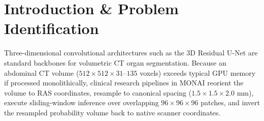 \documentclass[10pt,twocolumn]{article}
\begin{document}
\begin{abstract}
\smallskip
\noindent\textbf{Results:} Under identical sliding-window settings ($\text{overlap}=0.5, B=4$), our like-for-like custom CUDA + TensorRT FP16 pipeline (\texttt{trt\_fp16\_cuda}) reduces median end-to-end latency from $2,952.0\text{ ms}$ to $\mathbf{96.3\textbf{ ms}}$ ($\mathbf{30.7\times}$ cohort median speedup; paired patient-level mean speedup $\mathbf{33.1\times}$, $95\%$ CI $[27.6\times, 38.7\times]$) and cuts peak VRAM from $2,301\text{ MB}$ to $\mathbf{455\textbf{ MB}}$ ($\mathbf{5.1\times}$ reduction). A fast sliding-window profile (\texttt{trt\_fp16\_optimized}, $\text{overlap}=0.25, B=8$) reaches $\mathbf{68.9\textbf{ ms}}$ median latency ($\mathbf{42.9\times}$ cohort speedup; paired patient-level median $\mathbf{46.6\times}$). Analytical \texttt{ConvTranspose3d+BatchNorm3d} folding reduces mean absolute logit error by $\mathbf{35.6\times}$ and achieves near-FP32 segmentation agreement under the evaluated conditions: across the pooled $N = 21$ internal and external validation patients, paired Two One-Sided Tests (TOST) establish statistical equivalence within $\Delta_V = \pm 0.10\text{ cm}^3$ (mean bias $-0.0059 \pm 0.0271\text{ cm}^3$, $90\%$ CI $[-0.0161, +0.0043]\text{ cm}^3$, $p_{\text{TOST}} < 10^{-6}$) and $\Delta_{\text{Dice}} = \pm 0.001$ ($p_{\text{TOST}} < 10^{-6}$), with only $0.009\%$ ($8.8/95,529$) of organ voxels flipping label on internal scans and $0.019\%$ ($23.2/167,879$) on unseen external \texttt{FLARE22} scans.
\end{abstract}

\section{Introduction \& Problem Identification}
Three-dimensional convolutional architectures such as the 3D Residual U-Net \cite{kerfoot2019,cicek2016} are standard backbones for volumetric CT organ segmentation. Because an abdominal CT volume ($512 \times 512 \times 31\text{--}135$ voxels) exceeds typical GPU memory if processed monolithically, clinical research pipelines in MONAI \cite{cardoso2022} reorient the volume to RAS coordinates, resample to canonical spacing ($1.5 \times 1.5 \times 2.0\text{ mm}$), execute sliding-window inference over overlapping $96 \times 96 \times 96$ patches, and invert the resampled probability volume back to native scanner coordinates.
\end{document}

